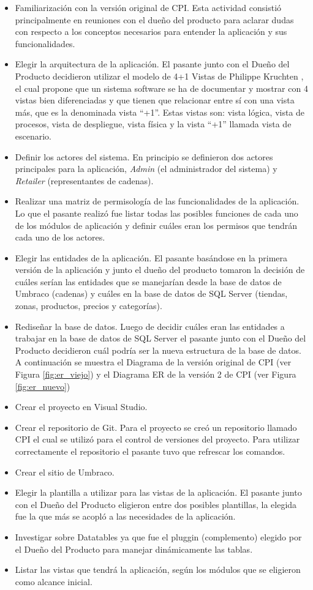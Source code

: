 \begin{itemize}
  \item Familiarización con la versión original de CPI. Esta actividad consistió principalmente en reuniones con el dueño del producto para aclarar dudas con respecto a los conceptos necesarios para entender la aplicación y sus funcionalidades.
  \item Elegir la arquitectura de la aplicación. El pasante junto con el Dueño del Producto decidieron utilizar el modelo de 4+1 Vistas de Philippe Kruchten \cite{vistasKruchten}, el cual  propone que un sistema software se ha de documentar y mostrar con 4 vistas bien diferenciadas y que tienen que relacionar entre sí con una vista más, que es la denominada vista “+1”. Estas vistas son: vista lógica, vista de procesos, vista de despliegue, vista física y la vista “+1” llamada vista de escenario.
  \item Definir los actores del sistema. En principio se definieron dos actores principales para la aplicación, \textit{Admin} (el administrador del sistema) y \textit{Retailer} (representantes de cadenas).
  \item Realizar una matriz de permisología de las funcionalidades de la aplicación. Lo que el pasante realizó fue listar todas las posibles funciones de cada uno de los módulos de aplicación y definir cuáles eran los permisos que tendrán cada uno de los actores.
  \item Elegir las entidades de la aplicación. El pasante basándose en la primera versión de la aplicación y junto el dueño del producto tomaron la decisión de cuáles serían las entidades que se manejarían desde la base de datos de Umbraco (cadenas) y cuáles en la base de datos de SQL Server (tiendas, zonas, productos, precios y categorías).
  \item Rediseñar la base de datos. Luego de decidir cuáles eran las entidades a trabajar en la base de datos de SQL Server el pasante junto con el Dueño del Producto decidieron cuál podría ser la nueva estructura de la base de datos. A continuación se muestra el Diagrama de la versión original de CPI (ver Figura \ref{fig:er_viejo}) y el Diagrama ER de la versión 2 de CPI (ver Figura \ref{fig:er_nuevo})
  \item Crear el proyecto en Visual Studio. 
  \item Crear el repositorio de Git. Para el proyecto se creó un repositorio llamado CPI el cual se utilizó para el control de versiones del proyecto. Para utilizar correctamente el repositorio el pasante tuvo que refrescar los comandos.
  \item Crear el sitio de Umbraco.
  \item Elegir la plantilla a utilizar para las vistas de la aplicación. El pasante junto con el Dueño del Producto eligieron entre dos posibles plantillas, la elegida fue la que más se acopló a las necesidades de la aplicación.
  \item Investigar sobre Datatables ya que fue el pluggin (complemento) elegido por el Dueño del Producto para manejar dinámicamente las tablas.
  \item Listar las vistas que tendrá la aplicación, según los módulos que se eligieron como alcance inicial.
\end{itemize}

